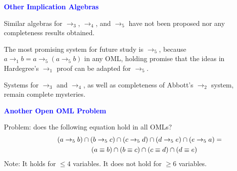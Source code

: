 \documentclass{slides}
\begin{document}
\begin{slide}
\textcolor{blue}{\textbf{Other Implication Algebras}}

Similar algebras for $\to_3$, $\to_4$, and $\to_5$ have not been
proposed nor any completeness results obtained.

The most promising
system for future study is $\to_5$, because  $a\to_1 b=
a\to_5 (a\to_5 b)$ in any OML, holding promise that
the ideas in Hardegree's $\to_1$
proof can be adapted for $\to_5$.

Systems for $\to_3$ and $\to_4$, as well as completeness of
Abbott's $\to_2$ system, remain complete mysteries.

\end{slide}

\begin{slide}

\textcolor{blue}{\textbf{Another Open OML Problem}}

Problem:  does the following equation hold in all OMLs?
\begin{eqnarray}
\lefteqn{(a \to_5 b) \cap (b \to_5 c)
      \cap (c \to_5 d) \cap (d \to_5 e) \cap (e \to_5 a)
          =}\qquad\qquad\nonumber\\
  & & (a \equiv b) \cap (b \equiv c) \cap (c \equiv d) \cap (d \equiv e)
      \label{eq:theeqi5}
\end{eqnarray}
Note:  It holds for $\le 4$ variables.  It does not hold for $\ge 6$ variables.
\end{slide}
\end{document}

